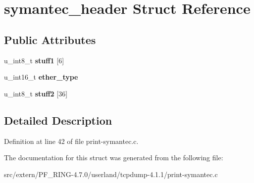 \hypertarget{structsymantec__header}{
\section{symantec\_\-header Struct Reference}
\label{structsymantec__header}
}
\subsection*{Public Attributes}
\begin{DoxyCompactItemize}
\item 
\hypertarget{structsymantec__header_aa78f77aa4a55a89d97276f135a7bceab}{
u\_\-int8\_\-t {\bfseries stuff1} \mbox{[}6\mbox{]}}
\label{structsymantec__header_aa78f77aa4a55a89d97276f135a7bceab}

\item 
\hypertarget{structsymantec__header_a5014a2a7dd949b4d92540ff130f8df09}{
u\_\-int16\_\-t {\bfseries ether\_\-type}}
\label{structsymantec__header_a5014a2a7dd949b4d92540ff130f8df09}

\item 
\hypertarget{structsymantec__header_a95c07c39543c19860b7abbe6593f92c9}{
u\_\-int8\_\-t {\bfseries stuff2} \mbox{[}36\mbox{]}}
\label{structsymantec__header_a95c07c39543c19860b7abbe6593f92c9}

\end{DoxyCompactItemize}


\subsection{Detailed Description}


Definition at line 42 of file print-\/symantec.c.



The documentation for this struct was generated from the following file:\begin{DoxyCompactItemize}
\item 
src/extern/PF\_\-RING-\/4.7.0/userland/tcpdump-\/4.1.1/print-\/symantec.c\end{DoxyCompactItemize}
